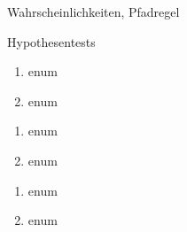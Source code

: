 


\begin{inhalt}
	\item Wahrscheinlichkeiten, Pfadregel
  \item Hypothesentests
\end{inhalt}

\begin{enumerate}
	\item enum
	\item	enum
\end{enumerate}

\begin{enumerate}
	\item enum
	\item	enum
\end{enumerate}

\begin{enumerate}
	\item enum
	\item	enum
\end{enumerate}


